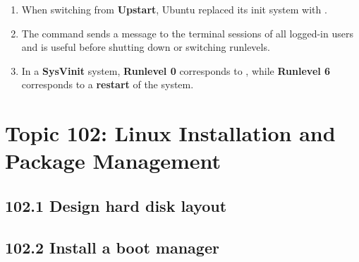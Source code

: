 \documentclass[12pt,a4paper]{report}
\begin{document}
\begin{enumerate}[1.]
\item When switching from \textbf{Upstart}, Ubuntu replaced its init system with \textbf{\underline{\hspace{2cm}}}.

\item The \textbf{\underline{\hspace{2cm}}} command sends a message to the terminal sessions of all logged-in users and is useful before shutting down or switching runlevels.

\item In a \textbf{SysVinit} system, \textbf{Runlevel 0} corresponds to \textbf{\underline{\hspace{2cm}}}, while \textbf{Runlevel 6} corresponds to a \textbf{restart} of the system.

\end{enumerate}

\chapter{Topic 102: Linux Installation and Package Management}


\section*{102.1 Design hard disk layout}




\section*{102.2 Install a boot manager}
\end{document}
